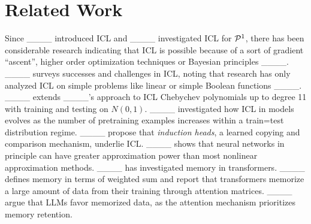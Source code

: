 \section{Related Work}
Since ____ introduced ICL and ____ investigated ICL for ${\cal P}^1$, there has been considerable research indicating that ICL is possible because of a sort of gradient ``ascent'', higher order optimization techniques or Bayesian principles ____. %
____ surveys successes and challenges in ICL, noting that research has only analyzed ICL on simple problems like linear or simple Boolean functions ____. ____ extends ____'s approach to ICL Chebychev polynomials up to degree 11 with training and testing on $N(0,1)$.   %
____ investigated how ICL in models evolves as the number of pretraining examples increases within a train=test distribution regime. ____ propose that {\em induction heads}, a learned copying and comparison mechanism, underlie ICL.  ____ shows that neural networks in principle can have greater approximation power than most nonlinear approximation methods.
____ has investigated memory in transformers.  ____ defines memory in terms of weighted sum and report that transformers memorize a large amount of data from their training through attention matrices. ____ argue that LLMs favor memorized data, as the attention mechanism prioritizes memory retention.%



